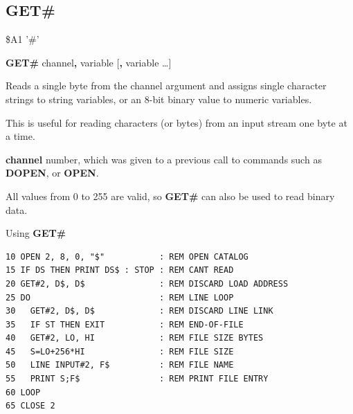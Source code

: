 \subsection{GET\#}
\begin{description}[leftmargin=2cm,style=nextline]
\item [Token:]    \$A1 '\#'

\item [Format:]   {\bf GET\#} channel{\bf,} variable [{\bf,} variable \dots]

\item [Usage:]    Reads a single byte from the channel argument and assigns single character strings to string variables, or an 8-bit binary value to numeric variables.

                  This is useful for reading characters (or bytes) from an input stream one byte at a time.

                  {\bf channel} number, which was given to a previous call to commands such as {\bf DOPEN}, or {\bf OPEN}.

\item [Remarks:]  All values from 0 to 255 are valid, so {\bf GET\#} can also be used to read binary data.

\item [Example:]  Using {\bf GET\#}

\begin{tcolorbox}[colback=black,coltext=white]
\verbatimfont{\codefont}
\begin{verbatim}
10 OPEN 2, 8, 0, "$"           : REM OPEN CATALOG
15 IF DS THEN PRINT DS$ : STOP : REM CANT READ
20 GET#2, D$, D$               : REM DISCARD LOAD ADDRESS
25 DO                          : REM LINE LOOP
30   GET#2, D$, D$             : REM DISCARD LINE LINK
35   IF ST THEN EXIT           : REM END-OF-FILE
40   GET#2, LO, HI             : REM FILE SIZE BYTES
45   S=LO+256*HI               : REM FILE SIZE
50   LINE INPUT#2, F$          : REM FILE NAME
55   PRINT S;F$                : REM PRINT FILE ENTRY
60 LOOP
65 CLOSE 2
\end{verbatim}
\end{tcolorbox}
\end{description}


\newpage
